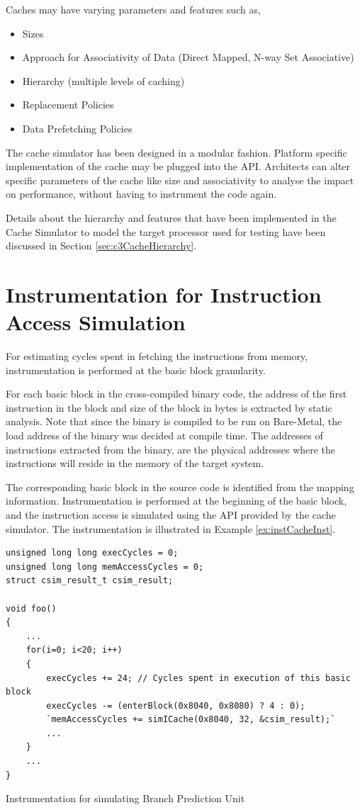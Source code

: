 Caches may have varying parameters and features such as,
\begin{itemize} \itemsep -2pt
\item Sizes
\item Approach for Associativity of Data (Direct Mapped, N-way Set Associative)
\item Hierarchy (multiple levels of caching)
\item Replacement Policies
\item Data Prefetching Policies
\end{itemize}

The cache simulator has been designed in a modular fashion. Platform specific implementation of the cache may be plugged into the API. Architects can alter specific parameters of the cache like size and associativity to analyse the impact on performance, without having to instrument the code again.

Details about the hierarchy and features that have been implemented in the Cache Simulator to model the target processor used for testing have been discussed in Section \ref{sec:c3CacheHierarchy}.

\section{Instrumentation for Instruction Access Simulation}
For estimating cycles spent in fetching the instructions from memory, instrumentation is performed at the basic block granularity. 

For each basic block in the cross-compiled binary code, the address of the first instruction in the block and size of the block in bytes is extracted by static analysis. Note that since the binary is compiled to be run on Bare-Metal, the load address of the binary was decided at compile time. The addresses of instructions extracted from the binary, are the physical addresses where the instructions will reside in the memory of the target system.

The corresponding basic block in the source code is identified from the mapping information. Instrumentation is performed at the beginning of the basic block, and the instruction access is simulated using the API provided by the cache simulator. The instrumentation is illustrated in Example \ref{ex:instCacheInst}.

\vspace*{10pt}
\begin{Example}[h!]
\begin{lstlisting}
unsigned long long execCycles = 0;
unsigned long long memAccessCycles = 0;
struct csim_result_t csim_result;

void foo()
{
    ...
    for(i=0; i<20; i++)
    {
        execCycles += 24; // Cycles spent in execution of this basic block
        execCycles -= (enterBlock(0x8040, 0x8080) ? 4 : 0);
        `memAccessCycles += simICache(0x8040, 32, &csim_result);`
        ...
    }
    ...
}
\end{lstlisting}
\caption{Instrumentation for simulating Branch Prediction Unit}
\label{ex:instCacheInst}
\end{Example}

